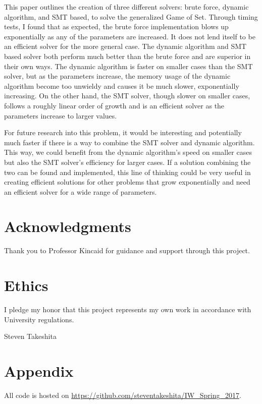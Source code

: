 \documentclass[pageno]{jpaper}
\begin{document}
This paper outlines the creation of three different solvers: brute force, dynamic algorithm, and SMT based, to solve the generalized Game of Set. Through timing tests, I found that as expected, the brute force implementation blows up exponentially as any of the parameters are increased. It does not lend itself to be an efficient solver for the more general case. The dynamic algorithm and SMT based solver both perform much better than the brute force and are superior in their own ways. The dynamic algorithm is faster on smaller cases than the SMT solver, but as the parameters increase, the memory usage of the dynamic algorithm become too unwieldy and causes it be much slower, exponentially increasing. On the other hand, the SMT solver, though slower on smaller cases, follows a roughly linear order of growth and is an efficient solver as the parameters increase to larger values. 


For future research into this problem, it would be interesting and potentially much faster if there is a way to combine the SMT solver and dynamic algorithm. This way, we could benefit from the dynamic algorithm's speed on smaller cases but also the SMT solver's efficiency for larger cases. If a solution combining the two can be found and implemented, this line of thinking could be very useful in creating efficient solutions for other problems that grow exponentially and need an efficient solver for a wide range of parameters. 


\section{Acknowledgments}

Thank you to Professor Kincaid for guidance and support through this project. 

\section{Ethics}

I pledge my honor that this project represents my own work in accordance with University regulations.

Steven Takeshita






\section{Appendix}

All code is hosted on \url{https://github.com/steventakeshita/IW_Spring_2017}.
\end{document}
